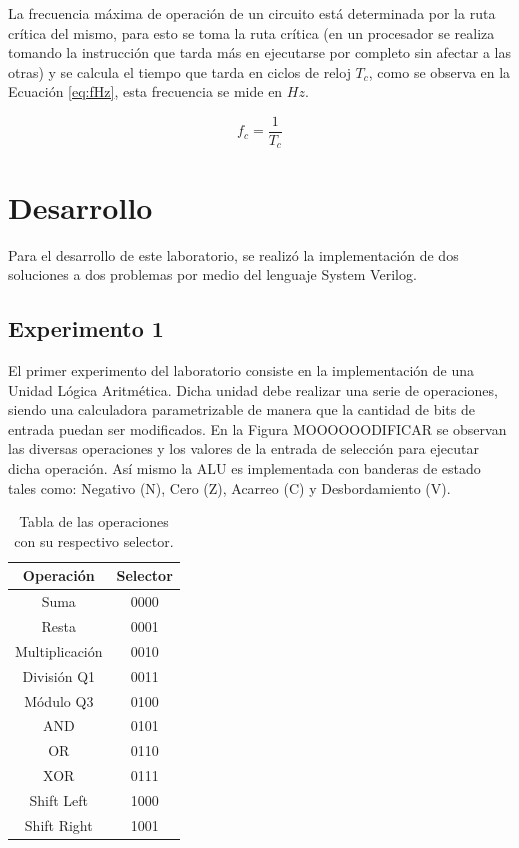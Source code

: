 \documentclass[journal]{IEEEtran}
\begin{document}
	La frecuencia máxima de operación de un circuito está determinada por la ruta crítica del mismo, para esto se toma la ruta crítica (en un procesador se realiza tomando la instrucción que tarda más en ejecutarse por completo sin afectar a las otras) y se calcula el tiempo que tarda en ciclos de reloj $T_{c}$, como se observa en la Ecuación \ref{eq:fHz}, esta frecuencia se mide en $Hz$.
	
	\begin{equation}
		f_{c} = \dfrac{1}{T_{c}}
		\label{eq:fHz}
	\end{equation}


	\section{Desarrollo}

	Para el desarrollo de este laboratorio, se realizó la implementación de dos soluciones a dos problemas por medio del lenguaje System Verilog.

	\subsection{Experimento 1}
	
	El primer experimento del laboratorio consiste en la implementación de una Unidad Lógica Aritmética. Dicha unidad debe realizar una serie de operaciones, siendo una calculadora parametrizable de manera que la cantidad de bits de entrada puedan ser modificados.
	En la Figura MOOOOOODIFICAR se observan las diversas operaciones y los valores de la entrada de selección para ejecutar dicha operación. Así mismo la ALU es implementada con banderas de estado tales como: Negativo (N), Cero (Z), Acarreo (C) y Desbordamiento (V).
	
	\begin{table}[hbtp]
		\begin{center}
			\caption{Tabla de las operaciones con su respectivo selector.}
			\label{tab:tabla1}
			
			\begin{tabular}{c | c }
				\hline
				\textbf{Operación} & \textbf{Selector} \\
				\hline Suma & 0000   \\
				\hline  Resta & 0001   \\
				\hline Multiplicación & 0010   \\
				\hline División Q1 & 0011   \\
				\hline Módulo Q3 & 0100   \\
				\hline AND & 0101   \\
				\hline OR & 0110   \\
				\hline XOR & 0111   \\
				\hline Shift Left & 1000   \\
				\hline Shift Right & 1001   \\
			\end{tabular}
		\end{center}
	\end{table}
\end{document}
